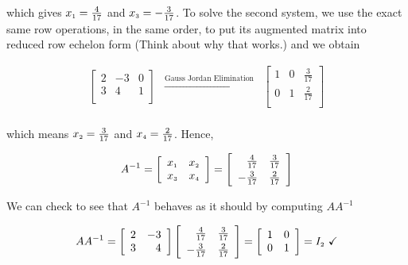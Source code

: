 which gives $x_{\mbox{\tiny$1$}} =  \frac{4}{17}$ and $x_{\mbox{\tiny$3$}} = -\frac{3}{17}$.  To solve the second system, we use the exact same row operations, in the same order, to put its augmented matrix into reduced row echelon form (Think about why that works.) and we obtain

\[ \begin{array}{ccc}

\left[ \begin{array}{rr|r} 2 & -3 & 0 \\ 3 & 4 & 1 \\ \end{array} \right] 
&
\xrightarrow{\text{Gauss Jordan Elimination}}

&
\left[ \begin{array}{rr|r} 1 & 0 & \frac{3}{17} \\[3pt] 0 & 1 & \frac{2}{17} \\ \end{array} \right] \\

\end{array}\]

which means $x_{\mbox{\tiny$2$}} = \frac{3}{17}$ and $x_{\mbox{\tiny$4$}} = \frac{2}{17}$.  Hence, 

\[  A^{-1} = \left[ \begin{array}{rr} x_{\mbox{\tiny$1$}} & x_{\mbox{\tiny$2$}} \\ x_{\mbox{\tiny$3$}} & x_{\mbox{\tiny$4$}} \\ \end{array} \right] = \left[ \begin{array}{rr} \frac{4}{17} & \frac{3}{17} \\[3pt]  -\frac{3}{17} & \frac{2}{17} \\ \end{array} \right]   \]

We can check to see that $A^{-1}$ behaves as it should by computing $AA^{-1}$

\[ AA^{-1} = \left[ \begin{array}{rr} 2 & -3 \\ 3 & 4 \\ \end{array} \right] \left[ \begin{array}{rr} \frac{4}{17} & \frac{3}{17} \\[3pt]  -\frac{3}{17} & \frac{2}{17} \\ \end{array} \right] = \left[ \begin{array}{rr} 1 & 0 \\ 0 & 1 \\ \end{array} \right] = I_{\mbox{\tiny$2$}} \, \, \checkmark\]


